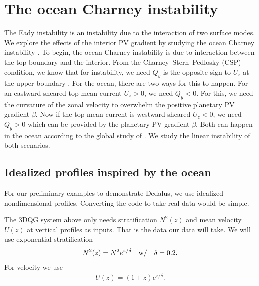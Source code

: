 \section{The ocean Charney instability}
The Eady instability is an instability due to the interaction of two surface modes. We explore the effects of the interior PV gradient by studying the ocean Charney instability \parencite{CapetEtAl_16}. To begin, the ocean Charney instability is due to interaction between the top boundary and the interior. From the Charney–Stern–Pedlosky (CSP) condition, we know that for instability, we need $Q_y$ is the opposite sign to $U_z$ at the upper boundary \parencite[p. 351]{Vallis_17}. For the ocean, there are two ways for this to happen. For an eastward sheared top mean current $U_z>0$, we need $Q_y<0$. For this, we need the curvature of the zonal velocity to overwhelm the positive planetary PV gradient $\beta$. Now if the top mean current is westward sheared $U_z<0$, we need $Q_y>0$ which can be provided by the planetary PV gradient $\beta$. Both can happen in the ocean according to the global study of \cite{TullochEtAl_11}. We study the linear instability of both scenarios. 

\subsection{Idealized profiles inspired by the ocean}
For our preliminary examples to demonstrate Dedalus, we use idealized nondimensional profiles. Converting the code to take real data would be simple. 

The 3DQG system above only needs stratification $N^2(z)$ and mean velocity $U(z)$ at vertical profiles as inputs. That is the data our data will take. We will use exponential stratification
\begin{align}
    N^2(z) = N^2 e^{z/\delta} \quad \mbox{w/} \quad \delta=0.2.
\end{align}
For velocity we use
\begin{align}
    U(z) = (1+z)e^{z/\delta}.
\end{align}


